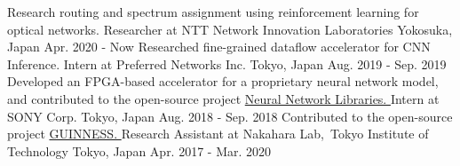 
\begin{cventries}
  \eduentry
    {Research routing and spectrum assignment using reinforcement learning for optical networks. } %
    {Researcher at NTT Network Innovation Laboratories} %
    {Yokosuka, Japan} %
    {Apr. 2020 - Now} %
  \eduentry
    {Researched fine-grained dataflow accelerator for CNN Inference. } %
    {Intern at Preferred Networks Inc.} %
    {Tokyo, Japan} %
    {Aug. 2019 - Sep. 2019} %
  \eduentry
    {Developed an FPGA-based accelerator for a proprietary neural network model, and contributed to the open-source project \href{https://github.com/sony/nnabla}{Neural Network Libraries. }} %
    {Intern at SONY Corp.} %
    {Tokyo, Japan} %
    {Aug. 2018 - Sep. 2018} %
  \eduentry
    {Contributed to the open-source project \href{https://github.com/HirokiNakahara/GUINNESS}{GUINNESS. }} %
    {Research Assistant at Nakahara Lab,\ Tokyo Institute of Technology} 
    {Tokyo, Japan} %
    {Apr. 2017 - Mar. 2020} %
\end{cventries}
